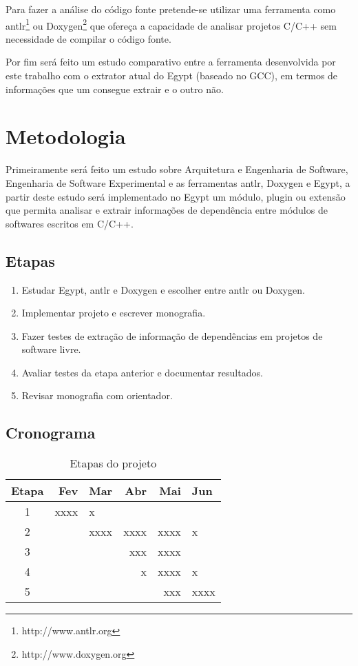 Para fazer a análise do código fonte pretende-se utilizar uma ferramenta como
antlr\footnote{http://www.antlr.org} ou Doxygen\footnote{http://www.doxygen.org}
que ofereça a capacidade de analisar projetos C/C++ sem necessidade de compilar
o código fonte.

Por fim será feito um estudo comparativo entre a ferramenta desenvolvida por
este trabalho com o extrator atual do Egypt (baseado no GCC), em termos de
informações que um consegue extrair e o outro não.

\chapter{Metodologia}

Primeiramente será feito um estudo sobre Arquitetura e Engenharia de Software,
Engenharia de Software Experimental e as ferramentas antlr, Doxygen e Egypt, a
partir deste estudo será implementado no Egypt um módulo, plugin ou extensão
que permita analisar e extrair informações de dependência entre módulos de
softwares escritos em C/C++.

\section{Etapas}

\begin{enumerate}
\item Estudar Egypt, antlr e Doxygen e escolher entre antlr ou Doxygen.
\item Implementar projeto e escrever monografia.
\item Fazer testes de extração de informação de dependências em projetos de software livre.
\item Avaliar testes da etapa anterior e documentar resultados.
\item Revisar monografia com orientador.
\end{enumerate}

\section{Cronograma}

\begin{table}
\caption{Etapas do projeto}
\centering
\begin{tabular}{c r l r r l}
Etapa  & Fev  & Mar  & Abr  & Mai  & Jun  \\
\hline
1      & xxxx & x    &      &      &      \\
2      &      & xxxx & xxxx & xxxx & x    \\
3      &      &      &  xxx & xxxx &      \\
4      &      &      &    x & xxxx & x    \\
5      &      &      &      &  xxx & xxxx \\
\hline
\end{tabular}
\end{table}
